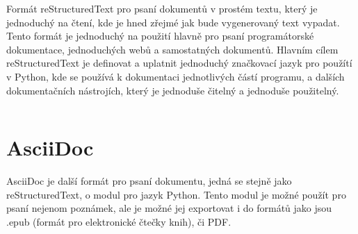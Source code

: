 Formát reStructuredText pro psaní dokumentů v prostém textu, který je jednoduchý na čtení, kde je hned zřejmé jak bude vygenerovaný text vypadat.
Tento formát je jednoduchý na použití hlavně pro psaní programátorské dokumentace, jednoduchých webů a samostatných dokumentů.
Hlavním cílem reStructuredText je definovat a uplatnit jednoduchý značkovací jazyk pro použítí v Python, kde se používá k dokumentaci jednotlivých částí programu,
a dalších dokumentačních nástrojích, který je jednoduše čitelný a jednoduše použitelný. \cite{reStruDoc}

\inputminted{rst}{example-rst.rst}



\section{AsciiDoc}

AsciiDoc je další formát pro psaní dokumentu, jedná se stejně jako reStructuredText, o modul pro jazyk Python. Tento modul je možné použít pro psaní nejenom poznámek,
ale je možné jej exportovat i do formátů jako jsou .epub (formát pro elektronické čtečky knih), či PDF. \cite{asciiDoc}

\inputminted{text}{example-ascii.adoc}

